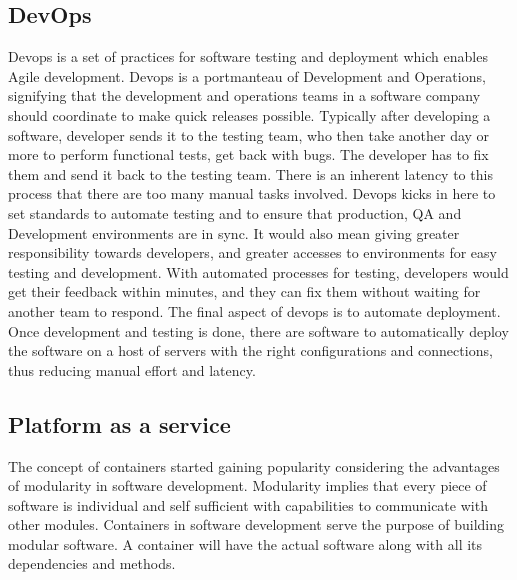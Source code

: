 \documentclass[9pt,twocolumn,twoside]{../../styles/osajnl}
\begin{document}
\subsection{DevOps}
Devops is a set of practices for software testing and deployment which enables Agile development. Devops is a portmanteau of Development and Operations, signifying that the development and operations teams in a software company should coordinate to make quick releases possible. Typically after developing a software, developer sends it to the testing team, who then take another day or more to perform functional tests, get back with bugs. The developer has to fix them and send it back to the testing team. There is an inherent latency to this process that there are too many manual tasks involved. Devops kicks in here to set standards to automate testing and to ensure that production, QA and Development environments are in sync. It would also mean giving greater responsibility towards developers, and greater accesses \TE to environments for easy testing and development. With automated processes for testing, developers would get their feedback within minutes, and they can fix them without waiting for another team to respond. The final aspect of devops is to automate deployment. Once development and testing is done, there are software \GE to automatically deploy the software on a host of servers with the right configurations and connections, thus reducing manual effort and latency. 


\subsection{Platform as a service}
The concept of containers started gaining popularity considering the advantages of modularity in software development. Modularity implies that every piece of software is individual and self sufficient with capabilities to communicate with other modules.  Containers in software development serve the purpose of building modular software. A container will have the actual software along with all its dependencies and methods. 
\end{document}
